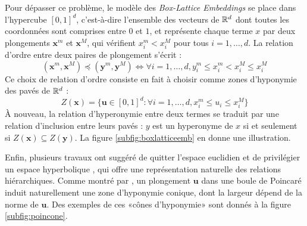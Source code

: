 Pour dépasser ce problème, le modèle des \textit{Box-Lattice Embeddings} \cite{vilnis2018probabilistic} se place dans l'hypercube $[0, 1]^d$, c'est-à-dire l'ensemble des vecteurs de $\mathbb{R}^d$ dont toutes les coordonnées sont comprises entre $0$ et $1$, et représente chaque terme $x$ par deux plongements $\textbf{x}^m$ et $\textbf{x}^M$, qui vérifient $x_i^m < x_i^M$ pour tous $i = 1, \ldots, d$. La relation d'ordre entre deux paires de plongement s'écrit :
\begin{equation}
    (\textbf{x}^m, \textbf{x}^M) \preceq (\textbf{y}^m, \textbf{y}^M) \iff \forall i = 1, \ldots, d, {} y_i^m \leq x_i^m < x_i^M \leq x_i^M
\end{equation}
Ce choix de relation d'ordre consiste en fait à choisir comme zones d'hyponymie des pavés de $\mathbb{R}^d$ :
\begin{equation}
    Z(\textbf{x}) = \{ \textbf{u} \in [0, 1]^d : \forall i=1, \ldots, d, {} x_i^m \leq u_i \leq x_i^M \}
\end{equation}
À nouveau, la relation d'hyperonymie entre deux termes se traduit par une relation d'inclusion entre leurs pavés : $y$ est un hyperonyme de $x$ si et seulement si $Z(\textbf{x}) \subseteq Z(\textbf{y})$. La figure \ref{subfig:boxlatticeemb} en donne une illustration.

Enfin, plusieurs travaux ont suggéré de quitter l'espace euclidien et de privilégier un espace hyperbolique \cite{nickel2017poincare, nickel2018learning, Aly_2019, dhingra2018embedding, ganea2018hyperbolic}, qui offre une représentation naturelle des relations hiérarchiques. Comme montré par \cite{ganea2018hyperbolic}, un plongement $\textbf{u}$ dans une boule de Poincaré induit naturellement une zone d'hyponymie conique, dont la largeur dépend de la norme de $\textbf{u}$. Des exemples de ces «cônes d'hyponymie» sont donnés à la figure \ref{subfig:poincone}.


